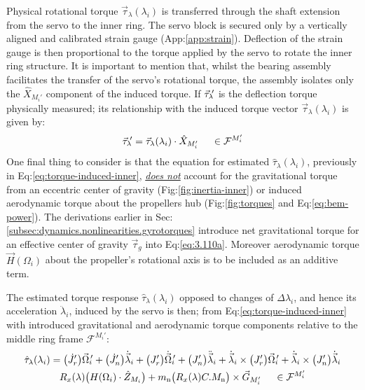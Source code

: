 \par
Physical rotational torque $\vec{\tau}_\lambda(\lambda_i)$ is transferred through the shaft extension from the servo to the inner ring. The servo block is secured only by a vertically aligned and calibrated strain gauge (App:\ref{app:strain}). Deflection of the strain gauge is then proportional to the torque applied by the servo to rotate the inner ring structure. It is important to mention that, whilst the bearing assembly facilitates the transfer of the servo's rotational torque, the assembly isolates only the $\hat{X}_{M_i'}$ component of the induced torque. If $\vec{\tau}_{\lambda}\text{}\hspace{-2pt}'$ is the deflection torque physically measured; its relationship with the induced torque vector $\vec{\tau}_{\lambda}(\lambda_i)$ is given by:
\begin{equation}\label{eq:tau-lambda-prime}
\vec{\tau}_{\lambda}\text{}\hspace{-2pt}'=\vec{\tau}_{\lambda}(\lambda_i)\cdot\hat{X}_{M_i'}~~~~\in\mathcal{F}^{M_i'}
\end{equation}
One final thing to consider is that the equation for estimated $\hat{\tau}_\lambda(\lambda_i)$, previously in Eq:\ref{eq:torque-induced-inner}, \underline{\emph{does not}} account for the gravitational torque from an eccentric center of gravity (Fig:\ref{fig:inertia-inner}) or induced aerodynamic torque about the propellers hub (Fig:\ref{fig:torques} and Eq:\ref{eq:bem-power}). The derivations earlier in Sec:\ref{subsec:dynamics.nonlinearities.gyrotorques} introduce net gravitational torque for an effective center of gravity $\vec{\tau}_g$ into Eq:\ref{eq:3.110a}. Moreover aerodynamic torque $\vec{H}(\Omega_i)$ about the propeller's rotational axis is to be included as an additive term.
\par
The estimated torque response $\hat{\tau}_\lambda(\lambda_i)$ opposed to changes of $\Delta\lambda_i$, and hence its acceleration $\ddot{\lambda}_i$, induced by the servo is then; from Eq:\ref{eq:torque-induced-inner} with introduced gravitational and aerodynamic torque components relative to the middle ring frame $\mathcal{F}^{M_i'}$:
\begin{multline}\label{eq:model-inner}
\hat{\tau}_\lambda(\lambda_i)=\big(\dot{J}_{r}'\big)\vec{\Omega}_i\text{}\hspace{-2pt}'+\big(\dot{J}_{n}'\big)\dot{\vec{\lambda}}_i+\big(J_r'\big)\dot{\vec{\Omega}}_i\text{}\hspace{-2pt}'+\big(J_{n}'\big)\ddot{\vec{\lambda}}_i+\dot{\vec{\lambda}}_i\times \big(J_r'\big)\vec{\Omega}_i\text{}\hspace{-2pt}'+\dot{\vec{\lambda}}_i\times \big(J_{n}'\big)\dot{\vec{\lambda}}_i
\\
R_x(\lambda)\big(H(\Omega_i)\cdot\hat{Z}_{M_i}\big)+m_\text{n}\big(R_x(\lambda)C.M_{\text{n}}\big)\times\vec{G}_{M_i'}~~~~\in\mathcal{F}^{M_i'}
\end{multline}
